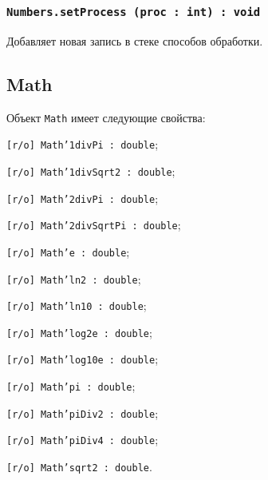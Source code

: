 \subsubsection{\texttt{Numbers.setProcess (proc : int) : void}}

Добавляет новая запись в стеке способов обработки.

\subsection{{\color{orange} Math}}

Объект \texttt{Math} имеет следующие свойства:
\begin{icItems}
	\item \texttt{[r/o] Math'1divPi : double};
	\item \texttt{[r/o] Math'1divSqrt2 : double};
	\item \texttt{[r/o] Math'2divPi : double};
	\item \texttt{[r/o] Math'2divSqrtPi : double};
	\item \texttt{[r/o] Math'e : double};
	\item \texttt{[r/o] Math'ln2 : double};
	\item \texttt{[r/o] Math'ln10 : double};
	\item \texttt{[r/o] Math'log2e : double};
	\item \texttt{[r/o] Math'log10e : double};
	\item \texttt{[r/o] Math'pi : double};
	\item \texttt{[r/o] Math'piDiv2 : double};
	\item \texttt{[r/o] Math'piDiv4 : double};
	\item \texttt{[r/o] Math'sqrt2 : double}.
\end{icItems}


